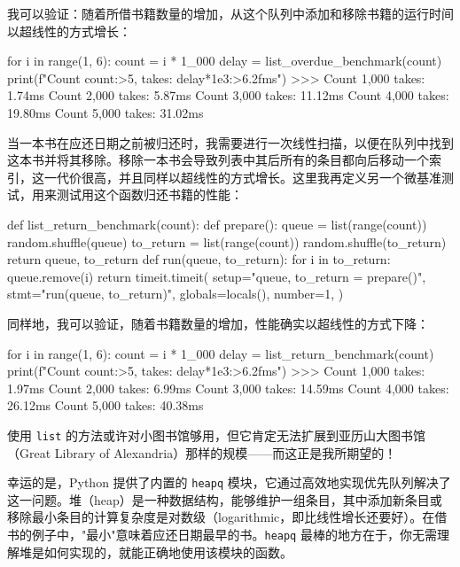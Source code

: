 我可以验证：随着所借书籍数量的增加，从这个队列中添加和移除书籍的运行时间以超线性的方式增长：

\begin{codebox}[python]
for i in range(1, 6):
    count = i * 1_000
    delay = list_overdue_benchmark(count)
    print(f"Count {count:>5,} takes: {delay*1e3:>6.2f}ms")
>>>
Count 1,000 takes:   1.74ms
Count 2,000 takes:   5.87ms
Count 3,000 takes:  11.12ms
Count 4,000 takes:  19.80ms
Count 5,000 takes:  31.02ms
\end{codebox}

当一本书在应还日期之前被归还时，我需要进行一次线性扫描，以便在队列中找到这本书并将其移除。移除一本书会导致列表中其后所有的条目都向后移动一个索引，这一代价很高，并且同样以超线性的方式增长。这里我再定义另一个微基准测试，用来测试用这个函数归还书籍的性能：

\begin{codebox}[python]
def list_return_benchmark(count):
    def prepare():
        queue = list(range(count))
        random.shuffle(queue)
        to_return = list(range(count))
        random.shuffle(to_return)
        return queue, to_return
    def run(queue, to_return):
        for i in to_return:
            queue.remove(i)
    return timeit.timeit(
        setup="queue, to_return = prepare()",
        stmt="run(queue, to_return)",
        globals=locals(),
        number=1,
    )
\end{codebox}

同样地，我可以验证，随着书籍数量的增加，性能确实以超线性的方式下降：

\begin{codebox}[python]
for i in range(1, 6):
    count = i * 1_000
    delay = list_return_benchmark(count)
    print(f"Count {count:>5,} takes: {delay*1e3:>6.2f}ms")
>>>
Count 1,000 takes:   1.97ms
Count 2,000 takes:   6.99ms
Count 3,000 takes:  14.59ms
Count 4,000 takes:  26.12ms
Count 5,000 takes:  40.38ms
\end{codebox}

使用 \texttt{list} 的方法或许对小图书馆够用，但它肯定无法扩展到亚历山大图书馆（Great Library of Alexandria）那样的规模——而这正是我所期望的！

幸运的是，Python 提供了内置的 \texttt{heapq} 模块，它通过高效地实现优先队列解决了这一问题。堆（heap）是一种数据结构，能够维护一组条目，其中添加新条目或移除最小条目的计算复杂度是对数级（logarithmic，即比线性增长还要好）。在借书的例子中，"最小"意味着应还日期最早的书。\texttt{heapq} 最棒的地方在于，你无需理解堆是如何实现的，就能正确地使用该模块的函数。

